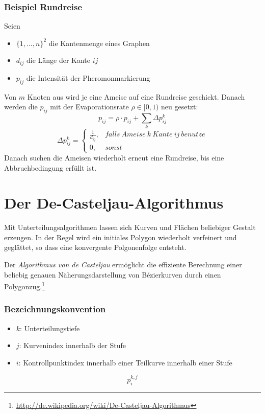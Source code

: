 \subsubsection{Beispiel Rundreise}
Seien
\begin{itemize}
	\item \(\{1,...,n\}^2\) die Kantenmenge eines Graphen
	\item \(d_{ij}\) die Länge der Kante \(ij\)
	\item \(p_{ij}\) die Intensität der Pheromonmarkierung
\end{itemize}
Von \(m\) Knoten aus wird je eine Ameise auf eine Rundreise geschickt. Danach werden die \(p_{ij}\) mit der Evaporationsrate \(\rho \in \lbrack 0,1)\) neu gesetzt:
\[p_{ij} = \rho \cdot p_{ij} + \sum_k \Delta p_{ij}^k\]
\[\Delta p_{ij}^k = \begin{cases} \frac{1}{d_{ij}}, & falls~Ameise~k~Kante~ij~benutze \\ 0, & sonst \end{cases}\]
Danach suchen die Ameisen wiederholt erneut eine Rundreise, bis eine Abbruchbedingung erfüllt ist.



\section{Der De-Casteljau-Algorithmus}
Mit Unterteilungsalgorithmen lassen sich Kurven und Flächen beliebiger Gestalt erzeugen. In der Regel wird ein initiales Polygon wiederholt verfeinert und geglättet, so dass eine konvergente Polgonenfolge entsteht.

Der \textit{Algorithmus von de Casteljau} ermöglicht die effiziente Berechnung einer beliebig genauen Näherungsdarstellung von Bézierkurven durch einen Polygonzug.\footnote{\url{http://de.wikipedia.org/wiki/De-Casteljau-Algorithmus}}


\subsubsection{Bezeichnungskonvention}
\begin{itemize}
	\item \(k\): Unterteilungstiefe
	\item \(j\): Kurvenindex innerhalb der Stufe
	\item \(i\): Kontrollpunktindex innerhalb einer Teilkurve innerhalb einer Stufe 
\end{itemize}
\[p_i^{k,j}\]


